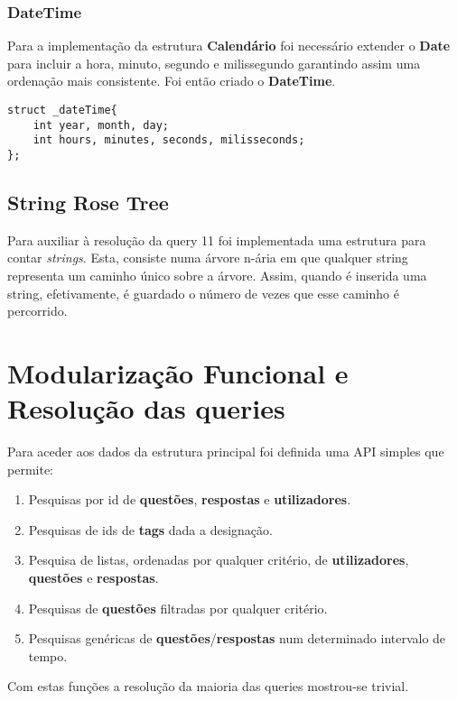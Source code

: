 \documentclass[10pt,a4paper]{article}
\begin{document}
        \subsubsection{DateTime}
        Para a implementação da estrutura \textbf{Calendário} foi necessário
        extender o \textbf{Date} para incluir a hora, minuto, segundo e
        milissegundo garantindo assim uma ordenação mais consistente. Foi
        então criado o \textbf{DateTime}.
    \begin{verbatim}
struct _dateTime{
    int year, month, day;
    int hours, minutes, seconds, milisseconds;
};
    \end{verbatim}

    \subsection{String Rose Tree}
    \label{sec:str_rose_tree}
    Para auxiliar à resolução da query 11 foi implementada uma estrutura para
    contar \textit{strings}. Esta, consiste numa árvore n-ária em que qualquer
    string representa um caminho único sobre a árvore. Assim, quando é inserida
    uma string, efetivamente, é guardado o número de vezes que esse caminho é
    percorrido.

\section{Modularização Funcional e Resolução das queries}
    Para aceder aos dados da estrutura principal foi definida uma API
    simples que permite:
    \begin{enumerate}[1.]
        \item Pesquisas por id de \textbf{questões}, \textbf{respostas} e
        \textbf{utilizadores}.
        \item Pesquisas de ids de \textbf{tags} dada a designação.
        \item Pesquisa de listas, ordenadas por qualquer critério, de
        \textbf{utilizadores}, \textbf{questões} e \textbf{respostas}.
        \item Pesquisas de \textbf{questões} filtradas por qualquer critério.
        \item Pesquisas genéricas de \textbf{questões}/\textbf{respostas}
        num determinado intervalo de tempo.
    \end{enumerate}

    Com estas funções a resolução da maioria das queries mostrou-se
    trivial.
\end{document}
